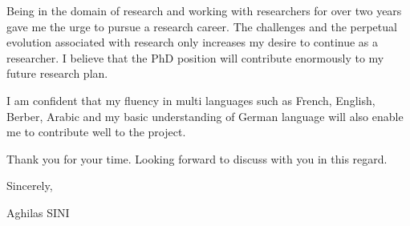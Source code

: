 \documentclass[10pt,a4paper]{letter}
\begin{document}
	Being in the domain of research and working  with researchers for over two years gave me the urge to pursue a research career. The challenges and the perpetual evolution associated  with research only increases my desire to continue as a researcher. I believe that the PhD position will contribute enormously to my future research plan. 
	
	I am confident that my fluency in multi languages such as French, English, Berber, Arabic and my basic understanding of German language  will also enable me to contribute well to the project.
 
	Thank you for your time. Looking forward to discuss with you in this regard.
	
Sincerely,

Aghilas SINI
	
		
\end{document}
